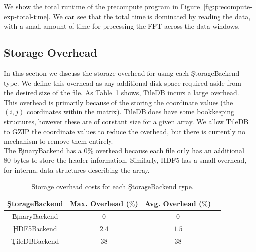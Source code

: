 We show the total runtime of the precompute program in
Figure~\ref{fig:precompute-exp-total-time}. We can see that the total time is
dominated by reading the data, with a small amount of time for processing the
FFT across the data windows.

\subsection{Storage Overhead}

In this section we discuss the storage overhead for using each
\c{StorageBackend} type. We define this overhead as any additional disk space
required aside from the desired size of the file. As
Table~\ref{table:storage-overhead} shows, TileDB incurs a large overhead. This
overhead is primarily because of the storing the coordinate values (the $(i,j)$
coordinates within the matrix). TileDB does have some bookkeeping structures,
however these are of constant size for a given array. We allow TileDB to GZIP
the coordinate values to reduce the overhead, but there is currently no
mechanism to remove them entirely. \\

The \c{BinaryBackend} has a $0\%$ overhead because each file only has an additional
80 bytes to store the header information. Similarly, HDF5 has a small overhead,
for internal data structures describing the array.

\begin{table}[h!]
\centering
 \begin{tabular}{|c |c |c |c|}
  \hline
  \c{StorageBackend} & Max. Overhead ($\%$) & Avg. Overhead ($\%$) \\
  \hline
  \c{BinaryBackend} & $0$ & $0$ \\
  \hline
  \c{HDF5Backend} & $2.4$ & $1.5$ \\
  \hline
  \c{TileDBBackend} & $38$ & $38$ \\
  \hline
\end{tabular}
\caption{Storage overhead costs for each \c{StorageBackend} type.}
\label{table:storage-overhead}
\end{table}

